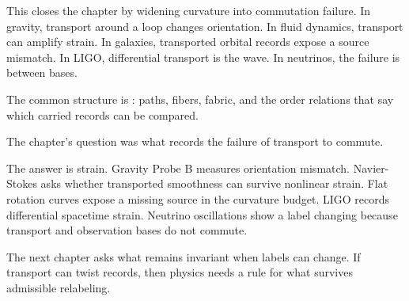 This closes the chapter by widening curvature into commutation failure. In
gravity, transport around a loop changes orientation. In fluid dynamics,
transport can amplify strain. In galaxies, transported orbital records expose a
source mismatch. In LIGO, differential transport is the wave. In neutrinos, the
failure is between bases.

The common structure is : paths, fibers, fabric, and the order
relations that say which carried records can be compared.

\begin{bridge}

The chapter's question was what records the failure of transport to commute.

The answer is strain. Gravity Probe B measures orientation mismatch. Navier-
Stokes asks whether transported smoothness can survive nonlinear strain. Flat
rotation curves expose a missing source in the curvature budget. LIGO records
differential spacetime strain. Neutrino oscillations show a label changing
because transport and observation bases do not commute.

The next chapter asks what remains invariant when labels can change. If
transport can twist records, then physics needs a rule for what survives
admissible relabeling.

\end{bridge}

